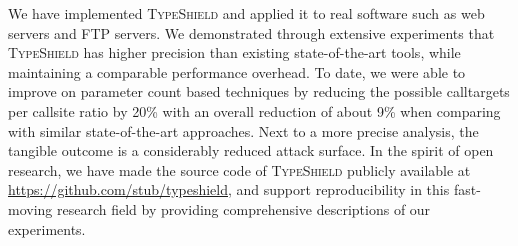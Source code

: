 We have implemented \textsc{TypeShield} and applied it to real software such as web servers 
and FTP servers. We demonstrated through extensive experiments that \textsc{TypeShield} has 
higher precision than existing state-of-the-art tools, while maintaining a comparable performance overhead. 
To date, we were able to improve on parameter count based techniques by reducing the possible calltargets per 
callsite ratio by 20\% with an overall reduction of about 9\% when comparing with similar state-of-the-art approaches. 
Next to a more precise analysis, the tangible outcome is a considerably reduced attack surface.
In the spirit of open research, we have made the source code of \textsc{TypeShield} publicly available 
at \url{https://github.com/stub/typeshield}, and support reproducibility in this fast-moving 
research field by providing comprehensive descriptions of our experiments.


